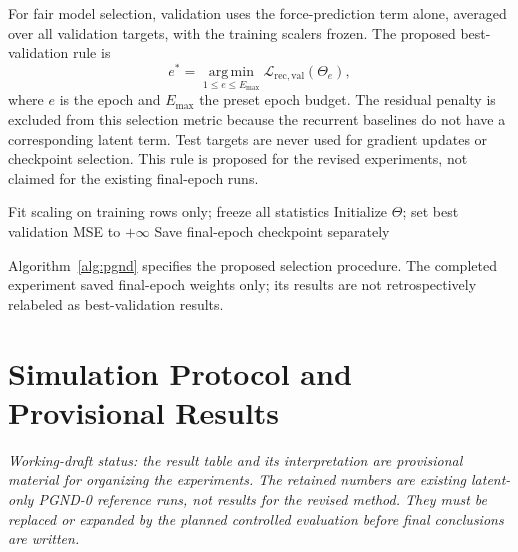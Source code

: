 \documentclass[journal,twoside]{IEEEtran}
\begin{document}
For fair model selection, validation uses the force-prediction term alone,
averaged over all validation targets, with the training scalers frozen.
The proposed best-validation rule is
\begin{equation}
    e^*=\underset{1\leq e\leq E_{\max}}{\operatorname{arg\,min}}
    \mathcal L_{\mathrm{rec,val}}(\Theta_e),
    \label{eq:validation_selection}
\end{equation}
where $e$ is the epoch and $E_{\max}$ the preset epoch budget. The residual
penalty is excluded from this selection metric because the recurrent
baselines do not have a corresponding latent term. Test targets are never
used for gradient updates or checkpoint selection. This rule is proposed
for the revised experiments, not claimed for the existing final-epoch runs.

\begin{algorithm}[t]
\caption{Training and Validation of Proposed PGND}
\label{alg:pgnd}
Fit scaling on training rows only; freeze all statistics\;
Initialize $\Theta$; set best validation MSE to $+\infty$\;
Save final-epoch checkpoint separately\;
\end{algorithm}

Algorithm~\ref{alg:pgnd} specifies the proposed selection procedure.
The completed experiment saved final-epoch weights only; its results
are not retrospectively relabeled as best-validation results.

\section{Simulation Protocol and Provisional Results}
\label{sec:experiments}

\noindent\emph{Working-draft status: the result table and its interpretation
are provisional material for organizing the experiments. The retained
numbers are existing latent-only PGND-0 reference runs, not results for
the revised method. They must be replaced or expanded by the planned
controlled evaluation before final conclusions are written.}
\end{document}
